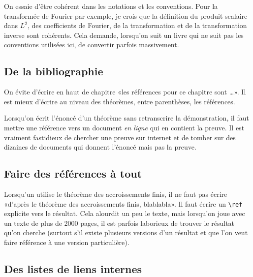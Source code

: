 On essaie d'être cohérent dans les notations et les conventions. Pour la transformée de Fourier par exemple, je crois que la définition du produit scalaire dans \( L^2\), des coefficients de Fourier, de la transformation et de la transformation inverse sont cohérents. Cela demande, lorsqu'on suit un livre qui ne suit pas les conventions utilisées ici, de convertir parfois massivement.

\subsection{De la bibliographie}

On évite d'écrire en haut de chapitre «les références pour ce chapitre sont \ldots». Il est mieux d'écrire au niveau des théorèmes, entre parenthèses, les références.

Lorsqu'on écrit l'énoncé d'un théorème sans retranscrire la démonstration, il faut mettre une référence vers un document \emph{en ligne} qui en contient la preuve. Il est vraiment fastidieux de chercher une preuve sur internet et de tomber sur des dizaines de documents qui donnent l'énoncé mais pas la preuve.

\subsection{Faire des références à tout}

Lorsqu'un utilise le théorème des accroissements finis, il ne faut pas écrire «d'après le théorème des accroissements finis, blablabla». Il faut écrire un \verb+\ref+ explicite vers le résultat. Cela alourdit un peu le texte, mais lorsqu'on joue avec un texte de plus de 2000 pages, il est parfois laborieux de trouver le résultat qu'on cherche (surtout s'il existe plusieurs versions d'un résultat et que l'on veut faire référence à une version particulière).

\subsection{Des listes de liens internes}

